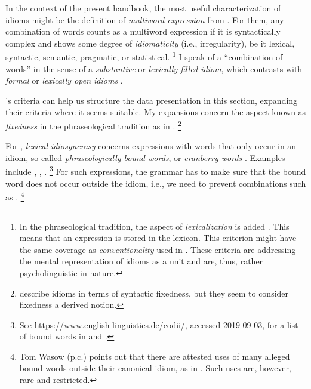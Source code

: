 \documentclass[output=paper,biblatex,babelshorthands,newtxmath,draftmode,colorlinks,citecolor=brown]{langscibook}
\begin{document}

In the context of the present handbook, the most useful characterization of idioms might be the
definition of \emph{multiword expression} from  \citet[]{Baldwin:Kim:10}.
For them, any combination of words counts as a multiword expression if it is syntactically complex
and shows some degree of \emph{idiomaticity} (i.e., irregularity), be it lexical, syntactic,
semantic, pragmatic, or statistical.%
\footnote{In the phraseological tradition, the aspect of \emph{lexicalization} is added
  \citep{Fleischer97a-u,Burger:98}. This means that an expression is stored in the lexicon. This
  criterion might have the same coverage as \emph{conventionality} used in
  \citet[492]{NSW94a}. These criteria are addressing the mental representation of idioms as a
  unit and are, thus, rather psycholinguistic in nature.} 
%
I speak of a ``combination of words'' in the sense of a \emph{substantive} or \emph{lexically filled idiom}, which 
contrasts with \emph{formal} or \emph{lexically open idioms} \citep[505]{FKoC88a}. 

\citeauthor{Baldwin:Kim:10}'s criteria can help us structure the data presentation in this section, expanding their criteria where it seems suitable.
My expansions concern the aspect known as \emph{fixedness} in the phraseological tradition as in \citet{Fleischer97a-u}.%
\footnote{\citet{Baldwin:Kim:10} describe idioms in terms of syntactic fixedness, but they seem to consider fixedness a derived notion.}

\begin{sloppypar}
%
For \citet{Baldwin:Kim:10}, \emph{lexical idiosyncrasy} concerns expressions with words that only
occur in an idiom, so-called \emph{phraseologically bound words}, or \emph{cranberry
  words} \citep[]{Aronoff76a-u}. Examples include , 
,
.%
\footnote{
See https://www.english-linguistics.de/codii/, accessed 2019-09-03, for a list of bound words in  and  \citep{Trawinski:al:08lrec}.}
For such expressions, the grammar has to make sure that the bound word does not occur outside the idiom, i.e., we need to prevent combinations such as .%
\footnote{Tom Wasow (p.c.) points out that there are attested uses of many alleged bound words outside their canonical idiom, as in . Such uses are, however, rare and restricted.
\zlast
}
\end{sloppypar}
\end{document}
